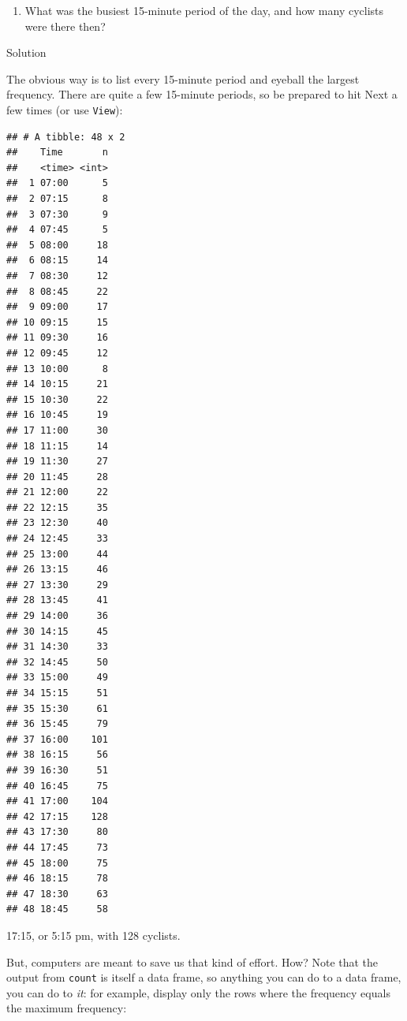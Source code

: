 \documentclass[]{tufte-book}
\newenvironment{Shaded}{}{}
\newcommand{\DataTypeTok}[1]{\textcolor[rgb]{0.56,0.13,0.00}{#1}}
\newcommand{\KeywordTok}[1]{\textcolor[rgb]{0.00,0.44,0.13}{\textbf{#1}}}
\newcommand{\NormalTok}[1]{#1}
\newcommand{\OperatorTok}[1]{\textcolor[rgb]{0.40,0.40,0.40}{#1}}
\newcommand{\OtherTok}[1]{\textcolor[rgb]{0.00,0.44,0.13}{#1}}
\newcommand{\StringTok}[1]{\textcolor[rgb]{0.25,0.44,0.63}{#1}}
\providecommand{\tightlist}{%
  \setlength{\itemsep}{0pt}\setlength{\parskip}{0pt}}
\theoremstyle{definition}
\theoremstyle{definition}
\theoremstyle{definition}
\theoremstyle{remark}
\begin{document}
\begin{enumerate}
\def\labelenumi{(\alph{enumi})}
\setcounter{enumi}{10}
\tightlist
\item
  What was the busiest 15-minute period of the day, and how many
  cyclists were there then?
\end{enumerate}

Solution

The obvious way is to list every 15-minute period and eyeball the
largest frequency. There are quite a few 15-minute periods, so be
prepared to hit Next a few times (or use \texttt{View}):

\begin{Shaded}
\end{Shaded}

\begin{verbatim}
## # A tibble: 48 x 2
##    Time       n
##    <time> <int>
##  1 07:00      5
##  2 07:15      8
##  3 07:30      9
##  4 07:45      5
##  5 08:00     18
##  6 08:15     14
##  7 08:30     12
##  8 08:45     22
##  9 09:00     17
## 10 09:15     15
## 11 09:30     16
## 12 09:45     12
## 13 10:00      8
## 14 10:15     21
## 15 10:30     22
## 16 10:45     19
## 17 11:00     30
## 18 11:15     14
## 19 11:30     27
## 20 11:45     28
## 21 12:00     22
## 22 12:15     35
## 23 12:30     40
## 24 12:45     33
## 25 13:00     44
## 26 13:15     46
## 27 13:30     29
## 28 13:45     41
## 29 14:00     36
## 30 14:15     45
## 31 14:30     33
## 32 14:45     50
## 33 15:00     49
## 34 15:15     51
## 35 15:30     61
## 36 15:45     79
## 37 16:00    101
## 38 16:15     56
## 39 16:30     51
## 40 16:45     75
## 41 17:00    104
## 42 17:15    128
## 43 17:30     80
## 44 17:45     73
## 45 18:00     75
## 46 18:15     78
## 47 18:30     63
## 48 18:45     58
\end{verbatim}

17:15, or 5:15 pm, with 128 cyclists.

But, computers are meant to save us that kind of effort. How? Note that
the output from \texttt{count} is itself a data frame, so anything you
can do to a data frame, you can do to \emph{it}: for example, display
only the rows where the frequency equals the maximum frequency:
\end{document}
